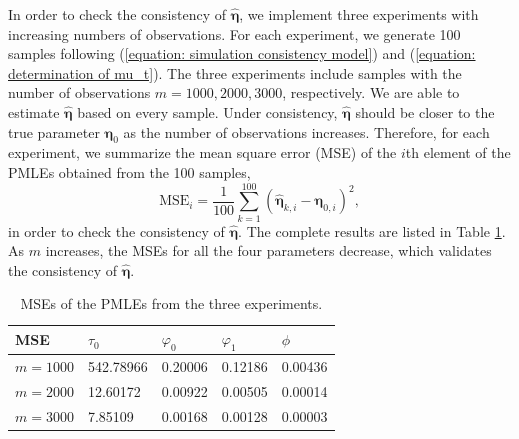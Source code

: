 \documentclass{article}
\theoremstyle{definition}
\begin{document}
In order to check the consistency of $\hat{\bm{\eta}}$, we implement three experiments with increasing numbers of observations. For each experiment, we generate 100 samples following (\ref{equation: simulation consistency model}) and (\ref{equation: determination of mu_t}). The three experiments include samples with the number of observations $m = 1000, 2000, 3000$, respectively. We are able to estimate $\hat{\bm{\eta}}$ based on every sample. Under consistency, $\hat{\bm{\eta}}$ should be closer to the true parameter $\bm{\eta}_0$ as the number of observations increases. Therefore, for each experiment, we summarize the mean square error (MSE) of the $i$th element of the PMLEs obtained from the 100 samples, 
\begin{equation*}
    \text{MSE}_i = \frac{1}{100} \sum_{k=1}^{100}(\hat{\bm{\eta}}_{k,i}-\bm{\eta}_{0,i})^2,
\end{equation*}
in order to check the consistency of $\hat{\bm{\eta}}.$ The complete results are listed in Table \ref{table: consistency}. As $m$ increases, the MSEs for all the four parameters decrease, which validates the consistency of $\hat{\bm{\eta}}.$
\begin{table}[!h]
\centering
\begin{tabular}{l|llll}
\hline
MSE        & $\tau_0$  & $\varphi_0$ & $\varphi_1$ & $\phi$  \\ \hline
$m = 1000$ & 542.78966 & 0.20006     & 0.12186     & 0.00436 \\
$m = 2000$ & 12.60172  & 0.00922     & 0.00505     & 0.00014 \\
$m = 3000$ & 7.85109   & 0.00168     & 0.00128     & 0.00003 \\ \hline
\end{tabular}
\caption{MSEs of the PMLEs from the three experiments.}
\label{table: consistency}
\end{table}
\end{document}
